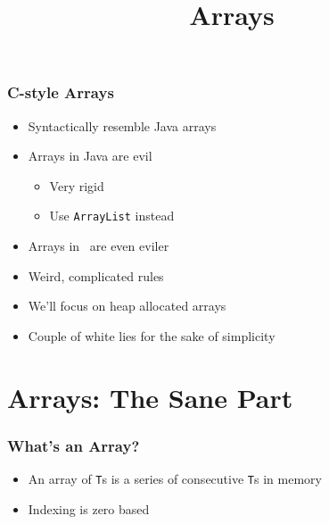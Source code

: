

\usetikzlibrary{shadows,shapes.multipart}

\title{Arrays}





\begin{frame}
  \titlepage
\end{frame}

\begin{frame}
  \frametitle{C-style Arrays}
  \begin{itemize}
    \item Syntactically resemble Java arrays
    \item Arrays in Java are evil
          \begin{itemize}
            \item Very rigid
            \item Use {\tt ArrayList} instead
          \end{itemize}
    \item Arrays in \cpp\ are even eviler
    \item Weird, complicated rules
    \item We'll focus on heap allocated arrays
    \item Couple of white lies for the sake of simplicity
  \end{itemize}
\end{frame}

\section{Arrays: The Sane Part}

\frame{\tableofcontents[currentsection]}

\begin{frame}
  \frametitle{What's an Array?}
  \begin{center}
  \end{center}
  \begin{itemize}
    \item An array of \texttt{T}s is a series of consecutive \texttt{T}s in memory
    \item Indexing is zero based
  \end{itemize}
\end{frame}

